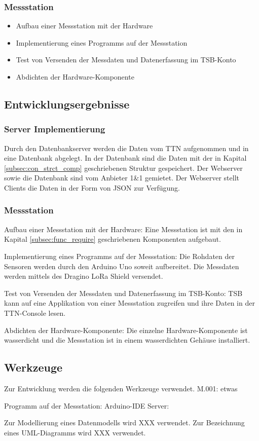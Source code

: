 \subsubsection{Messstation}
\begin{itemize}
	\item Aufbau einer Messstation mit der Hardware
	\item Implementierung eines Programms auf der Messstation
	\item Test von Versenden der Messdaten und Datenerfassung im TSB-Konto
	\item Abdichten der Hardware-Komponente
\end{itemize}

\subsection{Entwicklungsergebnisse}


\subsubsection{Server Implementierung}
Durch den Datenbankserver werden die Daten vom TTN aufgenommen und in eine Datenbank abgelegt. In der Datenbank sind die Daten mit der in Kapital \ref{subsec:con_strct_comp} geschriebenen Struktur gespeichert. Der Webserver sowie die Datenbank sind vom Anbieter 1\&1 gemietet. Der Webserver stellt Clients die Daten in der Form von JSON zur Verfügung.

\subsubsection{Messstation}
Aufbau einer Messstation mit der Hardware:
Eine Messstation ist mit den in Kapital \ref{subsec:func_require} geschriebenen Komponenten aufgebaut.

Implementierung eines Programms auf der Messstation:
Die Rohdaten der Sensoren werden durch den Arduino Uno soweit aufbereitet. Die Messdaten werden mittels des Dragino LoRa Shield versendet.

Test von Versenden der Messdaten und Datenerfassung im TSB-Konto:
TSB kann auf eine Applikation von einer Messstation zugreifen und ihre Daten in der TTN-Console lesen.

Abdichten der Hardware-Komponente:
Die einzelne Hardware-Komponente ist wasserdicht und die Messstation ist in einem wasserdichten Gehäuse installiert.

\subsection{Werkzeuge}


Zur Entwicklung werden die folgenden Werkzeuge verwendet.
M.001: etwas

Programm auf der Messstation: Arduino-IDE
Server:


Zur Modellierung eines Datenmodells wird XXX verwendet.
Zur Bezeichnung eines UML-Diagramms wird XXX verwendet.

